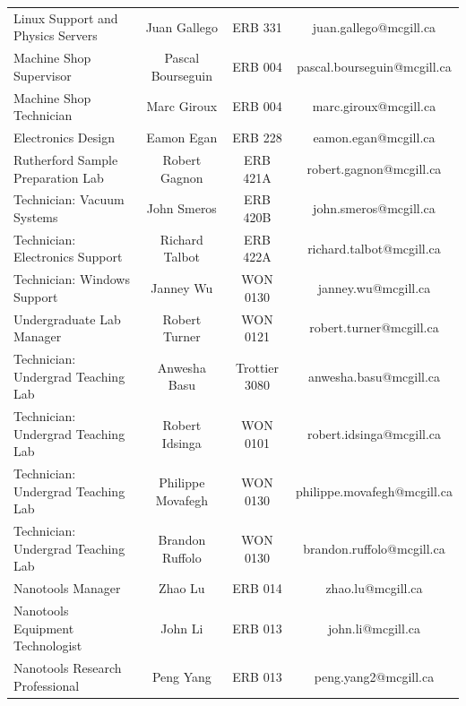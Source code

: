 \begin{table}[h!]
\begin{tabular}{|>{\columncolor{ocre!20}}lc>{\columncolor{ocre!20}}cc|}
        Linux Support and Physics Servers & Juan Gallego & ERB 331 & juan.gallego@mcgill.ca \\
        Machine Shop Supervisor & Pascal Bourseguin & ERB 004 & pascal.bourseguin@mcgill.ca \\
        Machine Shop Technician & Marc Giroux & ERB 004 & marc.giroux@mcgill.ca \\
        Electronics Design & Eamon Egan & ERB 228 & eamon.egan@mcgill.ca \\
        Rutherford Sample Preparation Lab &  Robert Gagnon & ERB 421A & robert.gagnon@mcgill.ca \\
        Technician: Vacuum Systems & John Smeros & ERB 420B & john.smeros@mcgill.ca \\
        Technician: Electronics Support & Richard Talbot & ERB 422A & richard.talbot@mcgill.ca \\
        Technician: Windows Support & Janney Wu & WON 0130 & janney.wu@mcgill.ca \\
        Undergraduate Lab Manager & Robert Turner & WON 0121 & robert.turner@mcgill.ca \\
        Technician: Undergrad Teaching Lab  & Anwesha Basu & Trottier 3080 & anwesha.basu@mcgill.ca \\
        Technician: Undergrad Teaching Lab  & Robert Idsinga & WON 0101 & robert.idsinga@mcgill.ca \\
        Technician: Undergrad Teaching Lab  & Philippe Movafegh & WON 0130 & philippe.movafegh@mcgill.ca \\
        Technician: Undergrad Teaching Lab & Brandon Ruffolo & WON 0130 & brandon.ruffolo@mcgill.ca \\
        Nanotools Manager & Zhao Lu & ERB 014 & zhao.lu@mcgill.ca \\
        Nanotools Equipment Technologist & John Li & ERB 013 & john.li@mcgill.ca \\
        Nanotools Research Professional & Peng Yang & ERB 013 & peng.yang2@mcgill.ca \\
        \hline
\end{tabular}
\end{table}
\newpage

